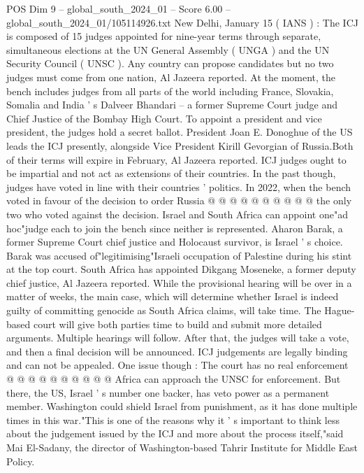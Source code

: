 \begin{textsample}{POS Dim 9 – global\_south\_2024\_01 – Score 6.00 – global\_south\_2024\_01/105114926.txt}  \label{ex:f9_pos_062}
New Delhi, January 15 ( IANS ) : The ICJ is composed of 15 judges appointed for nine-year terms through separate, simultaneous elections at the UN General Assembly ( UNGA ) and the UN Security Council ( UNSC ).
Any country can propose candidates but no two judges must come from one nation, Al Jazeera reported.
At the moment, the bench includes judges from all parts of the world including France, Slovakia, Somalia and India ' s Dalveer Bhandari -- a former Supreme Court judge and Chief Justice of the Bombay High Court.
To appoint a president and vice president, the judges hold a secret ballot.
President Joan E.
Donoghue of the US leads the ICJ presently, alongside Vice President Kirill Gevorgian of Russia.Both of their terms will expire in February, Al Jazeera reported.
ICJ judges ought to be impartial and not act as extensions of their countries.
In the past though, judges have voted in line with their countries ' politics.
In 2022, when the bench voted in favour of the decision to order Russia @ @ @ @ @ @ @ @ @ @ the only two who voted against the decision.
Israel and South Africa can appoint one"ad hoc"judge each to join the bench since neither is represented.
Aharon Barak, a former Supreme Court chief justice and Holocaust survivor, is Israel ' s choice.
Barak was accused of"legitimising"Israeli occupation of Palestine during his stint at the top court.
South Africa has appointed Dikgang Moseneke, a former deputy chief justice, Al Jazeera reported.
While the provisional hearing will be over in a matter of weeks, the main case, which will determine whether Israel is indeed guilty of committing genocide as South Africa claims, will take time.
The Hague-based court will give both parties time to build and submit more detailed arguments.
Multiple hearings will follow.
After that, the judges will take a vote, and then a final decision will be announced.
ICJ judgements are legally binding and can not be appealed.
One issue though : The court has no real enforcement @ @ @ @ @ @ @ @ @ @ Africa can approach the UNSC for enforcement.
But there, the US, Israel ' s number one backer, has veto power as a permanent member.
Washington could shield Israel from punishment, as it has done multiple times in this war."This is one of the reasons why it ' s important to think less about the judgement issued by the ICJ and more about the process itself,"said Mai El-Sadany, the director of Washington-based Tahrir Institute for Middle East Policy.

\end{textsample}
